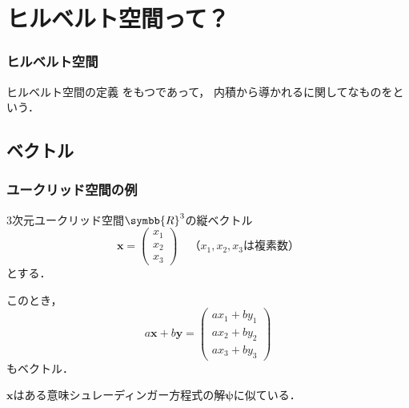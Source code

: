 \documentclass[
    10pt,
    ]{sotsu-beamer}
\begin{document}
\section{ヒルベルト空間って？}

\begin{frame}[label={frame:definition-of-Hilbert-space}]
    \frametitle{ヒルベルト空間}


    \pause

    \begin{block}{ヒルベルト空間の定義}
        をもつであって，
        内積から導かれるに関してなものをという．
    \end{block}

\end{frame}


\subsection{ベクトル}


\begin{frame}
    \frametitle{ユークリッド空間の例}

    3次元ユークリッド空間$\symbb{R}^3$の縦ベクトル
    \begin{equation*}
        \symbf{x} = 
        \begin{pmatrix}
            x_1 \\ x_2  \\ x_3
        \end{pmatrix}
        \quad
        \text{（$x_1, x_2, x_3$は複素数）}
    \end{equation*}
    とする．

    このとき，
    \begin{equation*}
        a \symbf{x} + b \symbf{y}
        = \begin{pmatrix}
            a x_1 + b y_1  \\
            a x_2 + b y_2  \\
            a x_3 + b y_3
        \end{pmatrix}
    \end{equation*}
    もベクトル．

    \pause

    $\symbf{x}$はある意味\alert{シュレーディンガー方程式の解$\symbf{\psi}$に似ている}．

\end{frame}
\end{document}

